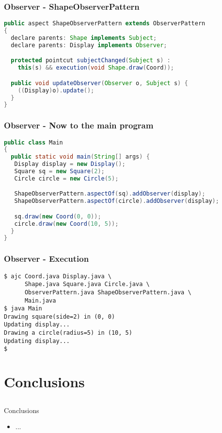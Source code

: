 \documentclass[11pt]{beamer}
\begin{document}
\begin{frame}[fragile]
   \frametitle{Observer - ShapeObserverPattern}
   {\footnotesize
   \begin{lstlisting}[language=java]
public aspect ShapeObserverPattern extends ObserverPattern
{
  declare parents: Shape implements Subject;
  declare parents: Display implements Observer;

  protected pointcut subjectChanged(Subject s) :
    this(s) && execution(void Shape.draw(Coord));

  public void updateObserver(Observer o, Subject s) {
    ((Display)o).update();
  }
}
   \end{lstlisting}
   }
\end{frame}

\begin{frame}[fragile]
   \frametitle{Observer - Now to the main program}
   {\scriptsize
\begin{lstlisting}[language=java]
public class Main
{
  public static void main(String[] args) {
   Display display = new Display();
   Square sq = new Square(2);
   Circle circle = new Circle(5);

   ShapeObserverPattern.aspectOf(sq).addObserver(display);
   ShapeObserverPattern.aspectOf(circle).addObserver(display);

   sq.draw(new Coord(0, 0));
   circle.draw(new Coord(10, 5));
  }
}
\end{lstlisting}
   }
\end{frame}

\begin{frame}[fragile]
   \frametitle{Observer - Execution}
   {\scriptsize
\begin{lstlisting}
$ ajc Coord.java Display.java \
      Shape.java Square.java Circle.java \
      ObserverPattern.java ShapeObserverPattern.java \
      Main.java
$ java Main
Drawing square(side=2) in (0, 0)
Updating display...
Drawing a circle(radius=5) in (10, 5)
Updating display...
$
\end{lstlisting}
   }
\end{frame}

\section{Conclusions}
\subsection*{}
\begin{frame}{Conclusions}
\begin{itemize}
\item ...
\end{itemize}
\end{frame}

\section*{}
\frame{\titlepage}

\end{document}
